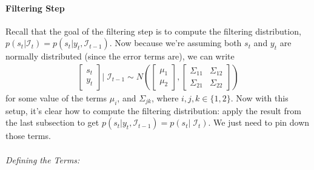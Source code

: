 \documentclass[a4paper,12pt]{article}
\begin{document}
\paragraph{Filtering Step}
Recall that the goal of the filtering step is to compute the
filtering distribution, $p(s_t|\mathcal{I}_{t})=p(s_t|y_t, \mathcal{I}_{t-1})$. Now because we're assuming both $s_t$ and $y_t$ are normally distributed (since the error terms are), we can write 
\begin{align*}
  \begin{bmatrix} s_t \\ y_t \end{bmatrix} | \; 
  \mathcal{I}_{t-1}
  \sim 
  N\left(\begin{bmatrix} \mu_1 \\ \mu_2 \end{bmatrix},
  \begin{bmatrix} \Sigma_{11} & \Sigma_{12} \\
  \Sigma_{21} & \Sigma_{22} \end{bmatrix} 
  \right)
\end{align*}
for some value of the terms $\mu_{i}$, and $\Sigma_{jk}$, where $i, j, k\in\{1,2\}$. Now with this setup, it's clear how to compute the filtering distribution: apply the result from the last subsection to get $p(s_t|y_t, \mathcal{I}_{t-1}) = p(s_t | \;\mathcal{I}_{t})$. We just need to pin down those terms.
\\
\\
{\sl Defining the Terms:}
\end{document}
